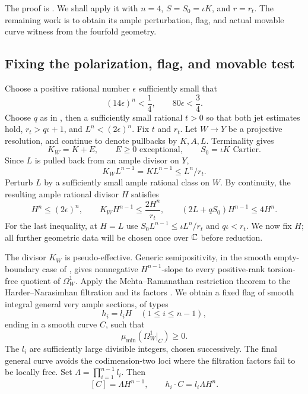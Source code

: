 The proof is \cite[Theorem~9.1]{OpenAIAbundance2026}.
We shall apply it with $n=4$, $S=S_0=\iota K$, and $r=r_t$.
The remaining work is to obtain its ample perturbation, flag, and
actual movable curve witness from the fourfold geometry.

\subsection{Fixing the polarization, flag, and movable test}

Choose a positive rational number $\epsilon$ sufficiently small that
\begin{equation}\label{eq:epsilon-choice}
 (14\epsilon)^n<\frac14,\qquad 80\epsilon<\frac34.
\end{equation}
Choose $q$ as in , then a sufficiently small
rational $t>0$ so that both jet estimates hold,
$r_t>q\iota+1$, and $L^n<(2\epsilon)^n$. Fix $t$ and $r_t$. Let
$W\to Y$ be a projective resolution, and continue to denote
pullbacks by $K,A,L$.  Terminality gives
\[
 K_W=K+E,\qquad E\ge0\text{ exceptional},\qquad S_0=\iota K\text{ Cartier}.
\]
Since $L$ is pulled back from an ample divisor on $Y$,
\[
 K_WL^{n-1}=KL^{n-1}\le L^n/r_t.
\]
Perturb $L$ by a sufficiently small ample rational class on $W$.
By continuity, the resulting ample rational divisor $H$ satisfies
\begin{equation}\label{eq:fixed-H}
 H^n\le(2\epsilon)^n,\qquad
 K_WH^{n-1}\le\frac{2H^n}{r_t},\qquad
 (2L+qS_0)H^{n-1}\le4H^n.
\end{equation}
For the last inequality, at $H=L$ use
$S_0L^{n-1}\le \iota L^n/r_t$ and $q\iota<r_t$.
We now fix $H$; all further geometric
data will be chosen once over $\mathbb C$ before reduction.

The divisor $K_W$ is pseudo-effective.  Generic semipositivity, in
the smooth empty-boundary case of
\cite[Theorem~2.1]{CampanaPaun2015}, gives nonnegative
$H^{n-1}$-slope to every positive-rank torsion-free quotient of
$\Omega_W^1$.  Apply the Mehta--Ramanathan restriction theorem to the
Harder--Narasimhan filtration and its factors
\cite[Theorem~6.1 and Remark~6.2]{MehtaRamanathan1982}.  We obtain a
fixed flag of smooth integral general very ample sections, of types
\[
 h_i=l_iH\quad(1\le i\le n-1),
\]
ending in a smooth curve $C$, such that
\begin{equation}\label{eq:fixed-curve-slope}
 \mu_{\min}(\Omega_W^1|_C)\ge0.
\end{equation}
The $l_i$ are sufficiently large divisible integers, chosen
successively.  The final general curve avoids the codimension-two
loci where the filtration factors fail to be locally free.  Set
$\Lambda=\prod_{i=1}^{n-1}l_i$.  Then
\begin{equation}\label{eq:flag-degrees}
 [C]=\Lambda H^{n-1},\qquad h_i\cdot C=l_i\Lambda H^n.
\end{equation}


